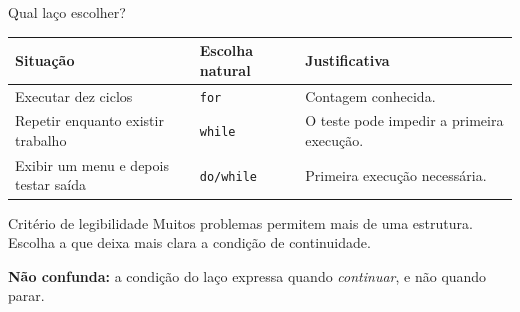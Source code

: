 \begin{frame}{Qual laço escolher?}
\begin{tabularx}{\textwidth}{XlX}
\toprule
Situação & Escolha natural & Justificativa \\
\midrule
Executar dez ciclos & \texttt{for} & Contagem conhecida. \\
Repetir enquanto existir trabalho & \texttt{while} & O teste pode impedir a primeira execução. \\
Exibir um menu e depois testar saída & \texttt{do/while} & Primeira execução necessária. \\
\bottomrule
\end{tabularx}
\vspace{0.35cm}
\begin{block}{Critério de legibilidade}
Muitos problemas permitem mais de uma estrutura. Escolha a que deixa mais clara a condição de continuidade.
\end{block}
\textbf{Não confunda:} a condição do laço expressa quando \emph{continuar}, e não quando parar.
\end{frame}
